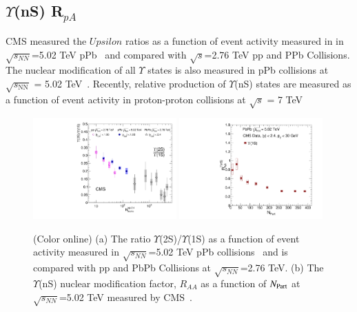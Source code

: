 \subsection{$\Upsilon$(nS) R$_{pA}$ }

CMS measured the $Upsilon$ ratios as a function of event activity measured in 
in $\sqrt{s_{NN}}$=5.02 TeV pPb~\cite{CMS:2013jsu} and compared with $\sqrt{s}$=2.76 TeV pp
and PPb Collisions.
 The nuclear modification of all $\Upsilon$ states is also measured in pPb collisions
 at $\sqrt{s_\mathrm{NN}}$ = 5.02 TeV~\cite{CMS:2022wfi}.
 Recently, relative production of $\Upsilon$(nS) states are measured as a function of
 event activity in proton-proton collisions at $ \sqrt{s} $ = 7 TeV~\cite{CMS:2020fae}

   


\begin{figure}
  \begin{center}
\includegraphics[width=0.49\textwidth]{Figures/ExpOverview/Fig_trk_pPb.pdf}
\includegraphics[width=0.49\textwidth]{Figures/ExpOverview/Fig_CMS_Y1SRAANPart.pdf}
\caption{(Color online)
  (a) The ratio $\Upsilon$(2S)/$\Upsilon$(1S) as a function of event activity measured in 
$\sqrt{s_{NN}}$=5.02 TeV pPb collisions~\cite{CMS:2013jsu} and is compared with pp
and PbPb Collisions at $\sqrt{s_{NN}}$=2.76 TeV.
(b) The $\Upsilon$(nS) nuclear modification factor, $R_{AA}$ as a function of $N_{\rm Part}$
at $\sqrt{s_{NN}}$=5.02 TeV measured by CMS~\cite{CMS:2018zza}.
}
\label{fig:UpsilonpPb}
\end{center}
\end{figure}

